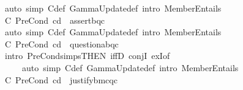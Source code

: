 \begin{isabellebody}
\isamarkupfalse%
\ {\isacharparenleft}{\kern0pt}auto\ simp{\isacharcolon}{\kern0pt}\ {\isasymGamma}\isactrlsub C{\isacharunderscore}{\kern0pt}def\ GammaUpdate{\isacharunderscore}{\kern0pt}def\ intro{\isacharbang}{\kern0pt}{\isacharcolon}{\kern0pt}\ MemberEntails{\isacharparenright}{\kern0pt}%
\endisatagproof
{\isafoldproof}%
%
\isadelimproof
\isanewline
%
\endisadelimproof
{}\isamarkupfalse%
\ C{}{\isacharcolon}{\kern0pt}\ {\isachardoublequoteopen}PreCond\ cd\ {\isasymDelta}\ assert{\isacharbrackleft}{\kern0pt}b{\isacharcomma}{\kern0pt}q\isactrlsup c{\isacharbrackright}{\kern0pt}{\isachardoublequoteclose}\isanewline
%
\isadelimproof
\ \ %
\endisadelimproof
%
\isatagproof
{}\isamarkupfalse%
\ {\isacharparenleft}{\kern0pt}auto\ simp{\isacharcolon}{\kern0pt}\ {\isasymGamma}\isactrlsub C{\isacharunderscore}{\kern0pt}def\ GammaUpdate{\isacharunderscore}{\kern0pt}def\ intro{\isacharbang}{\kern0pt}{\isacharcolon}{\kern0pt}\ MemberEntails{\isacharparenright}{\kern0pt}%
\endisatagproof
{\isafoldproof}%
%
\isadelimproof
\isanewline
%
\endisadelimproof
{}\isamarkupfalse%
\ C{}{\isacharcolon}{\kern0pt}\ {\isachardoublequoteopen}PreCond\ cd\ {\isasymDelta}\ question{\isacharbrackleft}{\kern0pt}a{\isacharcomma}{\kern0pt}b{\isacharcomma}{\kern0pt}q\isactrlsup c{\isacharbrackright}{\kern0pt}{\isachardoublequoteclose}\isanewline
%
\isadelimproof
\ \ %
\endisadelimproof
%
\isatagproof
{}\isamarkupfalse%
\ {\isacharparenleft}{\kern0pt}intro\ PreCond{\isachardot}{\kern0pt}simps{\isacharbrackleft}{\kern0pt}THEN\ iffD{}{\isacharbrackright}{\kern0pt}\ conjI\ exI{\isacharbrackleft}{\kern0pt}of\ {\isacharunderscore}{\kern0pt}\ {\isasymoplus}{\isacharbrackright}{\kern0pt}{\isacharparenright}{\kern0pt}\isanewline
\ \ \ \ \ {\isacharparenleft}{\kern0pt}auto\ simp{\isacharcolon}{\kern0pt}\ {\isasymGamma}\isactrlsub C{\isacharunderscore}{\kern0pt}def\ GammaUpdate{\isacharunderscore}{\kern0pt}def\ intro{\isacharbang}{\kern0pt}{\isacharcolon}{\kern0pt}\ MemberEntails{\isacharparenright}{\kern0pt}%
\endisatagproof
{\isafoldproof}%
%
\isadelimproof
\isanewline
%
\endisadelimproof
{}\isamarkupfalse%
\ C{}{\isacharcolon}{\kern0pt}\ {\isachardoublequoteopen}PreCond\ cd\ {\isasymDelta}\ justify{\isacharbrackleft}{\kern0pt}b{\isacharcomma}{\kern0pt}m\isactrlsup c{\isasymturnstile}\isactrlsup {\isasymoplus}q\isactrlsup c{\isacharbrackright}{\kern0pt}{\isachardoublequoteclose}\isanewline

\end{isabellebody}
